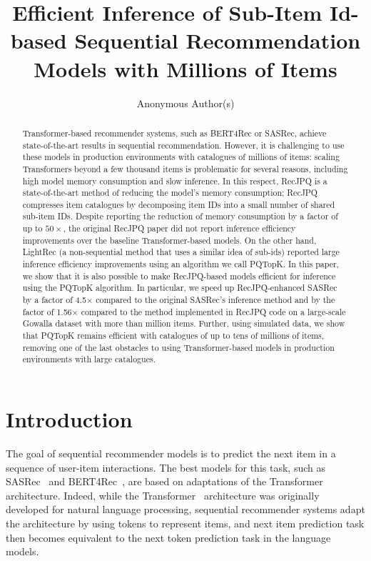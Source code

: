 \documentclass[sigconf,natbib=true, review=true]{acmart} %
\title{Efficient Inference of Sub-Item Id-based Sequential Recommendation Models with Millions of Items}
\author{Anonymous Author(s)}
\affiliation{%
  \institution{Organisation} \country{A Country}}
\newcommand{\pageenlarge}[1]{\marginnote{#1}\enlargethispage{#1\baselineskip}}
\newcommand{\rsasha}[1]{\textcolor[HTML]{FF0000}{#1}}
\begin{document}
\begin{abstract}
Transformer-based recommender systems, such as BERT4Rec or SASRec, achieve state-of-the-art results in sequential recommendation. However, it is challenging to use these models in production environments with catalogues of millions of items: scaling Transformers beyond a few thousand items is problematic for several reasons, including high model memory consumption and slow inference.  %
In this respect, RecJPQ is a state-of-the-art method of reducing the model's memory consumption; RecJPQ compresses item catalogues by decomposing item IDs into a small number of shared sub-item IDs. Despite reporting the reduction of memory consumption by a factor of up to $50\times$, the original RecJPQ paper did not report inference efficiency improvements over the baseline Transformer-based models. \rsasha{On the other hand, LightRec (a non-sequential method that uses a similar idea of sub-ids) reported large inference efficiency improvements using an algorithm we call PQTopK. In this paper, we show that it is also possible to make RecJPQ-based models efficient for inference using the PQTopK algorithm.} In particular, we speed up RecJPQ-enhanced SASRec by a factor of 4.5$\times$ compared to the original SASRec's inference method and by the factor of  1.56$\times$ compared to the method implemented in RecJPQ code on a large-scale Gowalla dataset with more than million items. Further, using simulated data, we show that PQTopK remains efficient with catalogues of up to tens of millions of items, removing one of the last obstacles to using Transformer-based models in production environments with large catalogues.
\end{abstract}

\maketitle

\section{Introduction} \label{sec:intro}
\pageenlarge{3}
The goal of sequential recommender models is to predict the next item in a sequence of user-item interactions. The best models for this task, such as SASRec~\cite{SASRec} and BERT4Rec~\cite{BERT4Rec}, are based on adaptations of the Transformer~\cite{Transformer} architecture. 
Indeed, while the Transformer~\cite{Transformer} architecture was originally developed for natural language processing, sequential recommender systems adapt the architecture by using tokens to represent items, \rsasha{and next item prediction task then becomes equivalent to the next token prediction task in the language models.}
\end{document}
